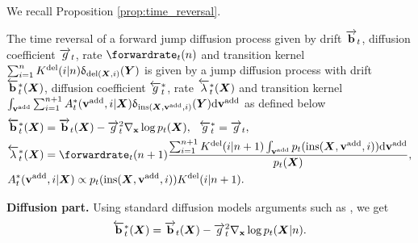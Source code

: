 We recall Proposition \ref{prop:time_reversal}.

\setcounter{proposition}{0}
\begin{proposition}
The time reversal of a forward jump diffusion process given by drift $\overrightarrow{\mathbf{b}}_t$,
diffusion coefficient $\overrightarrow{g}_t$, 
rate $\forwardrate_t(n)$ and
transition kernel $\sum_{i=1}^n
K^{\textup{del}}(i | n)
\updelta_{
\textup{del}({\bm{X}}, i)
}({\bm{Y}})$ 
is given by
a jump diffusion process with drift $\overleftarrow{\mathbf{b}}_t^*({\bm{X}})$, 
diffusion coefficient $\overleftarrow{g}_t^*$, rate $\overleftarrow{\lambda}_t^*({\bm{X}})$ and transition kernel $\int_{{\mathbf{v}}^{\textup{add}}} \sum_{i=1}^{n+1}  A^*_t({\mathbf{v}}^{\textup{add}}, i | {\bm{X}}) \updelta_{\textup{ins}({\bm{X}}, {\mathbf{v}}^{\textup{add}}, i)}({\bm{Y}}) \mathrm{d} {\mathbf{v}}^{\textup{add}}$ as defined below
\begin{align}
    &\backwarddrift_{t}^*(\mX) = \forwarddrift_{t}(\mX) - \forwarddiffcoeff_t^2 \nabla_{\rvx} \log p_{t}(\mX),~~\backwarddiffcoeff_{t}^* = \forwarddiffcoeff_{t},\\
    & \backwardrate_{t}^*(\mX) = \forwardrate_{t}(n+1) \frac{ \sum_{i=1}^{n+1} \delidxdist(i | n+1) \int_{\yadd} p_{t}( \textup{ins}(\mX, \yadd, i)) \rmd \yadd }{p_{t}(\mX)},\\
    & \autonet_{t}^*( \yadd, i | \mX) \propto p_{t}(\textup{ins}(\mX, \yadd, i) ) \delidxdist(i| n+1).
\end{align}
\end{proposition}





\textbf{Diffusion part. } Using standard diffusion models arguments such as
\cite{anderson1982reverse} \cite{conforti2022time}, we get
\begin{equation}
    \overleftarrow{\mathbf{b}}_{t}^*({\bm{X}}) = \overrightarrow{\mathbf{b}}_t({\bm{X}}) - \overrightarrow{g}_t^2 \nabla_{{\mathbf{x}}} \log p_t({\bm{X}} | n) . 
\end{equation}

